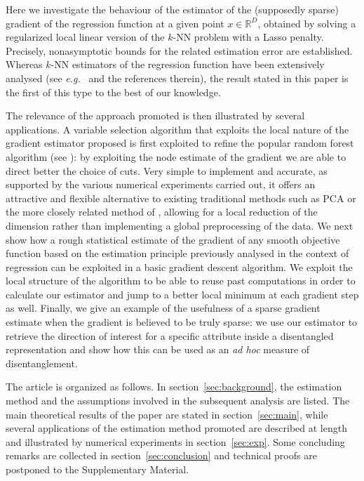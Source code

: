 Here we investigate the behaviour of the estimator of the (supposedly sparse) gradient of the regression function at a given point $x\in \mathbb{R}^D$, obtained by solving a regularized local linear version of the $k$-NN problem with a Lasso penalty. Precisely, nonasymptotic bounds for the related estimation error are established. Whereas $k$-NN estimators of the regression function have been extensively analysed (see \textit{e.g.}~\cite{biauRatesConvergenceFunctional2010,kpotufeKNNRegressionAdapts2011,jiangNonAsymptoticUniformRates2019} and the references therein), the result stated in this paper is the first of this type to the best of our knowledge. 

The relevance of the approach promoted is then illustrated by several applications. A variable selection algorithm that exploits the local nature of the gradient estimator proposed is first exploited to refine the popular random forest algorithm (see \cite{breimanRandomForests2001a}): by exploiting the node estimate of the gradient we are able to direct better the choice of cuts. Very simple to implement and accurate, as supported by the various numerical experiments carried out, it offers an attractive and flexible alternative to existing traditional methods such as PCA or the more closely related method of \cite{dalalyanNewAlgorithmEstimating2008}, allowing for a local reduction of the dimension rather than implementing a global preprocessing of the data.
We next show how a rough statistical estimate of the gradient of any smooth objective function based on the estimation principle previously analysed in the context of regression can be exploited in a basic gradient descent algorithm. We exploit the local structure of the algorithm to be able to reuse past computations in order to calculate our estimator and jump to a better local minimum at each gradient step as well.
Finally, we give an example of the usefulness of a sparse gradient estimate when the gradient is believed to be truly sparse: we use our estimator to retrieve the direction of interest for a specific attribute inside a disentangled representation and show how this can be used as an \textit{ad hoc} measure of disentanglement.

The article is organized as follows. In section~\ref{sec:background}, the estimation method and the assumptions involved in the subsequent analysis are listed. The main theoretical results of the paper are stated in section~\ref{sec:main}, while several applications of the estimation method promoted are described at length and illustrated by numerical experiments in section~\ref{sec:exp}. Some concluding remarks are collected in section~\ref{sec:conclusion} and technical proofs are postponed to the Supplementary Material.
